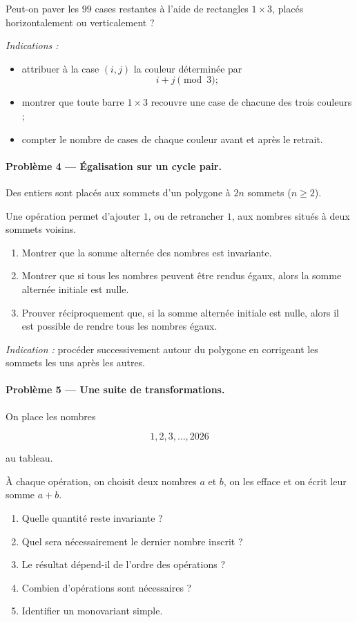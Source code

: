 Peut-on paver les \(99\) cases restantes à l'aide de rectangles \(1\times3\),
placés horizontalement ou verticalement ?

\emph{Indications :}

\begin{itemize}
    \item attribuer à la case \((i,j)\) la couleur déterminée par
    \[
    i+j\pmod 3;
    \]
    \item montrer que toute barre \(1\times3\) recouvre une case de chacune des
    trois couleurs ;
    \item compter le nombre de cases de chaque couleur avant et après le
    retrait.
\end{itemize}

\paragraph{Problème 4 --- Égalisation sur un cycle pair.}
Des entiers sont placés aux sommets d'un polygone à \(2n\) sommets
(\(n\geq2\)).

Une opération permet d'ajouter \(1\), ou de retrancher \(1\), aux nombres
situés à deux sommets voisins.

\begin{enumerate}
    \item Montrer que la somme alternée des nombres est invariante.
    \item Montrer que si tous les nombres peuvent être rendus égaux, alors la
    somme alternée initiale est nulle.
    \item Prouver réciproquement que, si la somme alternée initiale est nulle,
    alors il est possible de rendre tous les nombres égaux.
\end{enumerate}

\emph{Indication :} procéder successivement autour du polygone en corrigeant
les sommets les uns après les autres.

\paragraph{Problème 5 --- Une suite de transformations.}
On place les nombres

\[
1,2,3,\dots,2026
\]

au tableau.

À chaque opération, on choisit deux nombres \(a\) et \(b\), on les efface et
on écrit leur somme \(a+b\).

\begin{enumerate}
    \item Quelle quantité reste invariante ?
    \item Quel sera nécessairement le dernier nombre inscrit ?
    \item Le résultat dépend-il de l'ordre des opérations ?
    \item Combien d'opérations sont nécessaires ?
    \item Identifier un monovariant simple.
\end{enumerate}

